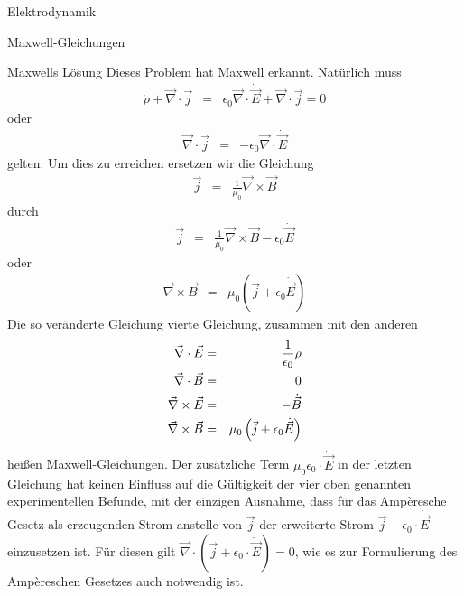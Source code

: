 \begin{chapter}{\titlestr}
\begin{section}{Elektrodynamik}
\begin{subsection}{Maxwell-Gleichungen}
\begin{subsubsection}{Maxwells Lösung}
Dieses Problem hat Maxwell erkannt. Natürlich muss
\begin{eqnarray*}
\dot{\rho} + \vec{\nabla}\cdot\vec{j} &=& \epsilon_0\vec{\nabla}\cdot\dot{\vec{E}} + \vec{\nabla}\cdot\vec{j} = 0
\end{eqnarray*}
oder
\begin{eqnarray*}
\vec{\nabla}\cdot\vec{j} &=&-\epsilon_0\vec{\nabla}\cdot\dot{\vec{E}}
\end{eqnarray*}
gelten. Um dies zu erreichen ersetzen wir die Gleichung
\begin{eqnarray*}
\vec{j} &=& \frac{1}{\mu_0}\vec{\nabla}\times\vec{B}
\end{eqnarray*}
durch
\begin{eqnarray*}
\vec{j} &=& \frac{1}{\mu_0}\vec{\nabla}\times\vec{B}-\epsilon_0\dot{\vec{E}}
\end{eqnarray*}
oder
\begin{eqnarray*}
\vec{\nabla}\times\vec{B} &=& \mu_0\left(\vec{j}+\epsilon_0\dot{\vec{E}}\right)
\end{eqnarray*}
Die so veränderte Gleichung vierte Gleichung, zusammen mit den anderen
\begin{eqnarray}
\label{maxwell_eqns}
\vec{\nabla}\cdot\vec{E} &=& \frac{1}{\epsilon_0}\rho\cr
\vec{\nabla}\cdot\vec{B} &=& 0\cr
\vec{\nabla}\times\vec{E} &=& -\dot{\vec{B}}\cr
\vec{\nabla}\times\vec{B} &=& \mu_0\left(\vec{j}+\epsilon_0\dot{\vec{E}}\right)
\end{eqnarray}
heißen Maxwell-Gleichungen. Der zusätzliche Term $\mu_0\epsilon_0\cdot\dot{\vec{E}}$ in der letzten Gleichung hat keinen Einfluss auf die Gültigkeit der vier oben genannten experimentellen Befunde, mit der einzigen Ausnahme, dass für das Ampèresche Gesetz als erzeugenden Strom anstelle von $\vec{j}$ der erweiterte Strom $\vec{j}+\epsilon_0\cdot\dot{\vec{E}}$ einzusetzen ist.
Für diesen gilt $\vec{\nabla}\cdot \left(\vec{j}+\epsilon_0\cdot\dot{\vec{E}}\right)=0$, wie es zur Formulierung des Ampèreschen Gesetzes auch notwendig ist.
\end{subsubsection}


\end{subsection}
\end{section}
\end{chapter}
